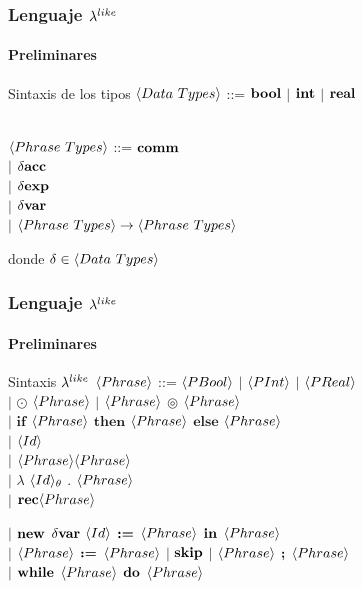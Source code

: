 \documentclass{beamer}
\begin{document}
\begin{frame}
\frametitle{Lenguaje $\lambda^{like}$}
\framesubtitle{Preliminares}

\begin{block}{Sintaxis de los tipos}
$\langle Data \ Types \rangle$ ::= $\textbf{bool}$ $|$ $\textbf{int}$ $|$ $\textbf{real}$\\

\

$\langle Phrase \ Types \rangle$ ::= $\textbf{comm}$\\
\quad \quad \quad \quad \quad 
\quad \quad \quad
$|$ $\delta \textbf{acc}$\\
\quad \quad \quad \quad \quad 
\quad \quad \quad
$|$ $\delta \textbf{exp}$ \\
\quad \quad \quad \quad \quad 
\quad \quad \quad
$|$ $\delta \textbf{var}$\\
\quad \quad \quad \quad \quad 
\quad \quad \quad
$|$ $\langle Phrase \ Types \rangle \rightarrow \langle Phrase \ Types \rangle$
\end{block}

donde $\delta \in \lrangles{Data \ Types}$

\end{frame}

\begin{frame}
\frametitle{Lenguaje $\lambda^{like}$}
\framesubtitle{Preliminares}

\begin{block}{Sintaxis $\lambda^{like}$}
$\langle Phrase \rangle$ ::= $\langle PBool \rangle$ $|$ $\langle PInt \rangle$ $|$ $\langle PReal \rangle$\\
\quad \quad \quad \quad \quad
$|$ $\odot$ $\langle Phrase \rangle$ $|$ $\langle Phrase \rangle$ $\circledcirc$ $\langle Phrase \rangle$\\
\quad \quad \quad \quad \quad
$|$ $\textbf{if}$ $\langle Phrase \rangle$ $\textbf{then}$ $\langle Phrase \rangle$ $\textbf{else}$ $\langle Phrase \rangle$\\
\quad \quad \quad \quad \quad
$|$ $\langle Id \rangle$\\
\quad \quad \quad \quad  \quad
$|$ $\langle Phrase \rangle\langle Phrase \rangle$\\
\quad \quad \quad \quad  \quad
$|$ $\lambda$ $\langle Id \rangle_\theta$ . $\langle Phrase \rangle$\\
\quad \quad \quad \quad  \quad
$|$ $\textbf{rec} \langle Phrase \rangle$\\

\pause

\quad \quad \quad \quad  \quad
$|$ $\textbf{new}$ $\delta \textbf{var}$ $\langle Id \rangle$ $\textbf{:=}$ $\langle Phrase \rangle$ $\textbf{in}$ $\langle Phrase \rangle$\\
\quad \quad \quad \quad  \quad
$|$ $\langle Phrase \rangle$ $\textbf{:=}$ $\langle Phrase \rangle$ $|$ $\textbf{skip}$ $|$ $\langle Phrase \rangle$ $\textbf{;}$ $\langle Phrase \rangle$\\
\quad \quad \quad \quad  \quad
$|$ $\textbf{while}$ $\langle Phrase \rangle$ $\textbf{do}$ $\langle Phrase \rangle$
\end{block}

\end{frame}
\end{document}
